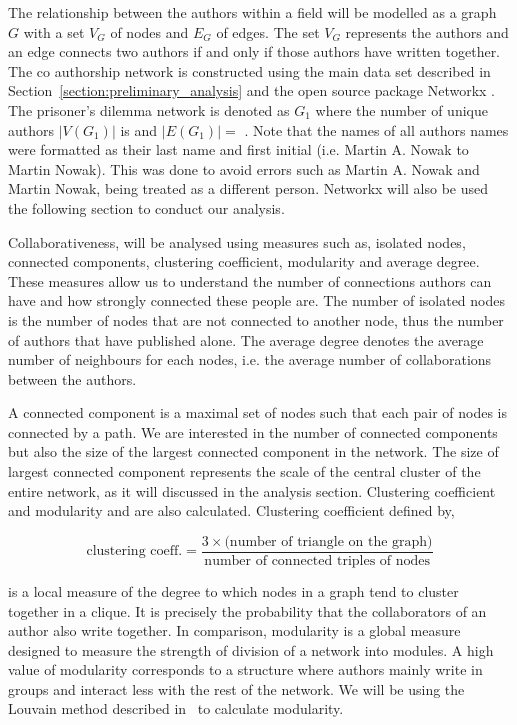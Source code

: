 \documentclass{article}
\theoremstyle{definition}
\newcommand{\authors}{}
\newcommand{\edges}{}
\begin{document}
The relationship between the authors within a field will be modelled as a graph \(G\) with
a set \(V_G\) of nodes and \(E_G\) of edges. The set \(V_G\) represents the authors
and an edge connects two authors if and only if those authors have written together.
The co authorship network is constructed using the main data set described in
Section~\ref{section:preliminary_analysis} and the open source package Networkx
\cite{networkx}. The prisoner's dilemma network is denoted as \(G_1\) where the
number of unique authors \(|V(G_1)|\) is \authors and \(|E(G_1)|=\) \edges.
Note that the names of all authors names were formatted as their last name and
first initial (i.e. Martin A. Nowak to Martin Nowak). This was done to avoid errors
such as Martin A. Nowak and Martin Nowak, being treated as a different person.
Networkx will also be used the following section to conduct our analysis.

Collaborativeness, will be analysed using measures such as, isolated nodes,
connected components, clustering coefficient, modularity and average degree.
These measures allow us to understand the number of connections authors can have
and how strongly connected these people are. The number of isolated nodes is the
number of nodes that are not connected to another node, thus the
number of authors that have published alone. The average degree denotes the average
number of neighbours for each nodes, i.e. the average number of collaborations
between the authors.

A connected component is a maximal set of nodes such that each pair of nodes is
connected by a path. We are interested in the number of connected components
but also the size of the largest connected component in the network.
The size of largest connected component represents the scale of the central cluster
of the entire network, as it will discussed in the analysis section.
Clustering coefficient and modularity and are also calculated.
Clustering coefficient defined by,

\[\text{clustering coeff.} =
\frac{3 \times \text{(number of triangle on the graph)}}{\text{number of connected triples of nodes}}\]

is a local measure of the degree to which nodes in a graph tend to cluster together
in a clique. It is precisely the probability that the collaborators
of an author also write together. In comparison, modularity is a global measure
designed to measure the strength of division of a network into modules. A high
value of modularity corresponds to a structure where authors mainly write
in groups and interact less with the rest of the network. We will be using the
Louvain method described in~\cite{Blondel2008} to calculate modularity.
\end{document}
